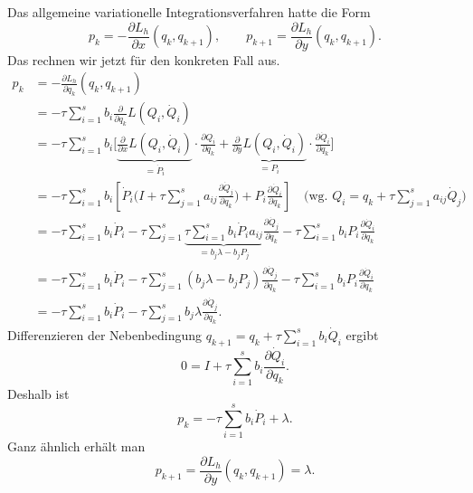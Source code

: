 \bigskip

Das allgemeine variationelle Integrationsverfahren hatte die Form
\begin{equation*}
p_k = -\frac{\partial L_h}{\partial x}(q_k,q_{k+1}),
\qquad
p_{k+1} = \frac{\partial L_h}{\partial y}(q_k,q_{k+1}).
\end{equation*}
Das rechnen wir jetzt für den konkreten Fall aus.
\begin{align*}
p_k &= -\frac{\partial L_h}{\partial q_k}(q_k,q_{k+1})\\
%
    &= -\tau\sum_{i=1}^s b_i\frac{\partial}{\partial q_k} L(Q_i,\dot{Q}_i)\\
%
    &= -\tau\sum_{i=1}^s b_i\Bigg[ \underbrace{\frac{\partial}{\partial x} L(Q_i,\dot{Q}_i)}_{=\dot{P}_i} \cdot \frac{\partial Q_i}{\partial q_k}
       +  \underbrace{\frac{\partial}{\partial y} L(Q_i,\dot{Q}_i)}_{=P_i} \cdot \frac{\partial\dot Q_i}{\partial q_k}     \Bigg] \\
%
    &= -\tau \sum_{i=1}^s b_i \left[\dot{P}_i\bigg( I +\tau\sum_{j=1}^s a_{ij}\frac{\partial\dot{Q}_j}{\partial q_k} \bigg) + P_i\frac{\partial\dot{Q}_i}{\partial q_k}\right]
    \quad \text{(wg. } Q_i = q_k+\tau\sum_{j=1}^s a_{ij}\dot{Q}_j\text{)}\\
%
    &= -\tau \sum_{i=1}^s b_i\dot{P}_i -\tau\sum_{j=1}^s\underbrace{\tau\sum_{i=1}^s b_i\dot{P}_i a_{ij}}_{=b_j\lambda -b_jP_j}\frac{\partial\dot{Q}_j}{\partial q_k}
      - \tau\sum_{i=1}^s b_i P_i\frac{\partial\dot{Q}_i}{\partial q_k}\\
%
    &= -\tau \sum_{i=1}^s b_i\dot{P}_i -\tau\sum_{j=1}^s(b_j\lambda -b_j P_j) \frac{\partial\dot{Q}_j}{\partial q_k}
      - \tau\sum_{i=1}^s b_i P_i\frac{\partial\dot{Q}_i}{\partial q_k}\\
%
    &= -\tau \sum_{i=1}^s b_i\dot{P}_i - \tau\sum_{j=1}^s b_j\lambda  \frac{\partial\dot{Q}_j}{\partial q_k}.
\end{align*}
Differenzieren der Nebenbedingung $q_{k+1} = q_k + \tau\sum_{i=1}^s b_i\dot{Q}_i$ ergibt
\begin{equation*}
0 = I + \tau\sum_{i=1}^s b_i\frac{\partial \dot{Q}_i}{\partial q_k}.
\end{equation*}
Deshalb ist
\begin{equation}
\label{eq:allgemeines_vi_hoher_ordnung_konkret_1}
p_k = -\tau\sum_{i=1}^s b_i\dot{P}_i + \lambda.
\end{equation}
Ganz ähnlich erhält man
\begin{equation}
\label{eq:allgemeines_vi_hoher_ordnung_konkret_2}
p_{k+1} = \frac{\partial L_h}{\partial y}(q_k,q_{k+1}) = \lambda.
\end{equation}
